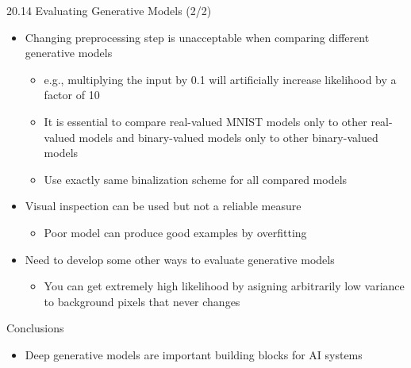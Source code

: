 \documentclass[dvipdfmx,presentation]{beamer}
\begin{document}
\begin{frame}[label={sec:orgheadline54}]{20.14 Evaluating Generative Models (2/2)}
\begin{itemize}
\item Changing preprocessing step is unacceptable when comparing different generative models
\begin{itemize}
\item e.g., multiplying the input by 0.1 will artificially increase likelihood by a factor of 10
\item It is essential to compare real-valued MNIST models only to other real-valued models and binary-valued models only to other binary-valued models
\item Use exactly same binalization scheme for all compared models
\end{itemize}
\item Visual inspection can be used but not a reliable measure
\begin{itemize}
\item Poor model can produce good examples by overfitting
\end{itemize}
\item Need to develop some other ways to evaluate generative models
\begin{itemize}
\item You can get extremely high likelihood by asigning arbitrarily low variance to background pixels that never changes
\end{itemize}
\end{itemize}
\end{frame}

\begin{frame}[label={sec:orgheadline55}]{Conclusions}
\begin{itemize}
\item Deep generative models are important building blocks for AI systems
\end{itemize}
\end{frame}
\end{document}

